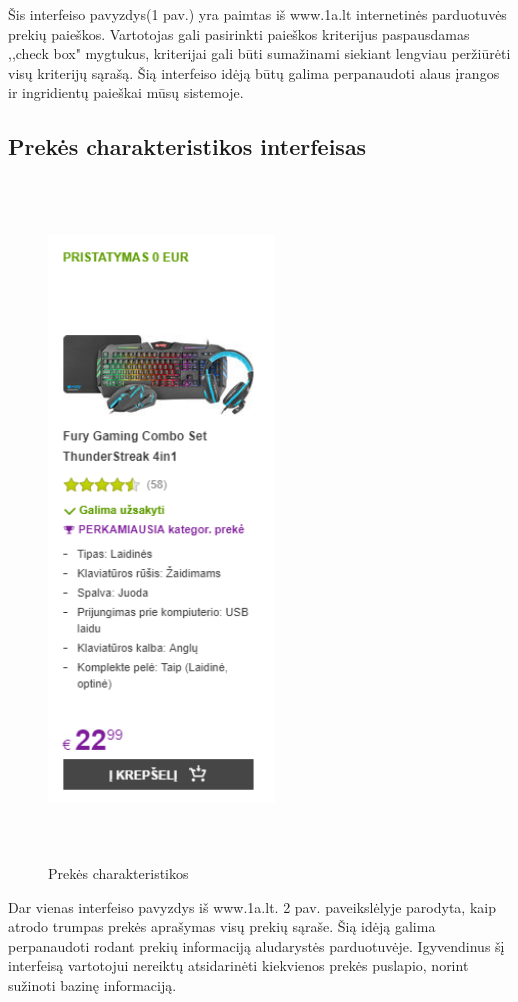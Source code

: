 \documentclass[oneside]{VUMIFPSkursinis}
\begin{document}
		Šis interfeiso pavyzdys(1 pav.) yra paimtas iš www.1a.lt internetinės parduotuvės prekių paieškos.
		Vartotojas gali pasirinkti paieškos kriterijus paspausdamas ,,check box" mygtukus, kriterijai gali būti sumažinami siekiant lengviau peržiūrėti visų kriterijų sąrašą.
		Šią interfeiso idėją būtų galima perpanaudoti alaus įrangos ir ingridientų paieškai mūsų sistemoje.
	\pagebreak
	\subsection{Prekės charakteristikos interfeisas}
		\begin{figure}[h]
			\centering
			\includegraphics[width=6cm,height=18cm,keepaspectratio]{IkvepiantisInterfeisas2.png}
			\caption{ Prekės charakteristikos}
		\end{figure}
		 Dar vienas interfeiso pavyzdys iš www.1a.lt. 2 pav.
		 paveikslėlyje parodyta, kaip atrodo trumpas prekės aprašymas visų prekių sąraše.
		 Šią idėją galima perpanaudoti rodant prekių informaciją aludarystės parduotuvėje.
		 Igyvendinus šį interfeisą vartotojui nereiktų atsidarinėti kiekvienos prekės puslapio, norint sužinoti bazinę informaciją.
		\pagebreak
\end{document}
